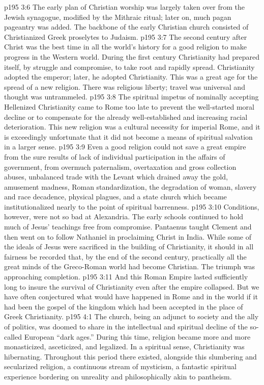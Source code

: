 \pc \vs p195 3:6 The early plan of Christian worship was largely taken over from the Jewish synagogue, modified by the Mithraic ritual; later on, much pagan pageantry was added. The backbone of the early Christian church consisted of Christianized Greek proselytes to Judaism.
\pc \vs p195 3:7 The second century after Christ was the best time in all the world’s history for a good religion to make progress in the Western world. During the first century Christianity had prepared itself, by struggle and compromise, to take root and rapidly spread. Christianity adopted the emperor; later, he adopted Christianity. This was a great age for the spread of a new religion. There was religious liberty; travel was universal and thought was untrammeled.
\vs p195 3:8 The spiritual impetus of nominally accepting Hellenized Christianity came to Rome too late to prevent the well\hyp{}started moral decline or to compensate for the already well\hyp{}established and increasing racial deterioration. This new religion was a cultural necessity for imperial Rome, and it is exceedingly unfortunate that it did not become a means of spiritual salvation in a larger sense.
\vs p195 3:9 Even a good religion could not save a great empire from the sure results of lack of individual participation in the affairs of government, from overmuch paternalism, overtaxation and gross collection abuses, unbalanced trade with the Levant which drained away the gold, amusement madness, Roman standardization, the degradation of woman, slavery and race decadence, physical plagues, and a state church which became institutionalized nearly to the point of spiritual barrenness.
\vs p195 3:10 Conditions, however, were not so bad at Alexandria. The early schools continued to hold much of Jesus’ teachings free from compromise. Pantaenus taught Clement and then went on to follow Nathaniel in proclaiming Christ in India. While some of the ideals of Jesus were sacrificed in the building of Christianity, it should in all fairness be recorded that, by the end of the second century, practically all the great minds of the Greco\hyp{}Roman world had become Christian. The triumph was approaching completion.\plusone
\vs p195 3:11 And this Roman Empire lasted sufficiently long to insure the survival of Christianity even after the empire collapsed. But we have often conjectured what would have happened in Rome and in the world if it had been the gospel of the kingdom which had been accepted in the place of Greek Christianity.
\vs p195 4:1 The church, being an adjunct to society and the ally of politics, was doomed to share in the intellectual and spiritual decline of the so\hyp{}called European “dark ages.” During this time, religion became more and more monasticized, asceticized, and legalized. In a spiritual sense, Christianity was hibernating. Throughout this period there existed, alongside this slumbering and secularized religion, a continuous stream of mysticism, a fantastic spiritual experience bordering on unreality and philosophically akin to pantheism.\plusone
